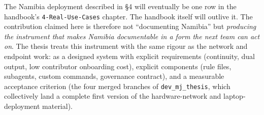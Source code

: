 The Namibia deployment described in §4 will eventually be one row in the
handbook's \texttt{4-Real-Use-Cases} chapter. The handbook itself will
outlive it. The contribution claimed here is therefore not ``documenting
Namibia'' but \emph{producing the instrument that makes Namibia
documentable in a form the next team can act on}. The thesis treats this
instrument with the same rigour as the network and endpoint work: as a
designed system with explicit requirements (continuity, dual output, low
contributor onboarding cost), explicit components (rule files,
subagents, custom commands, governance contract), and a measurable
acceptance criterion (the four merged branches of
\texttt{dev\_mj\_thesis}, which collectively land a complete first
version of the hardware-network and laptop-deployment material).
